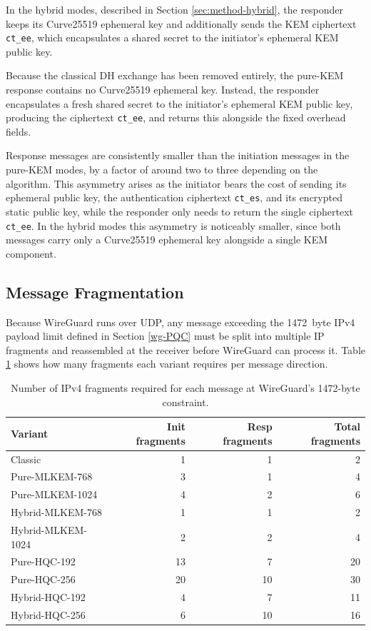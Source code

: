 In the hybrid modes, described in Section \ref{sec:method-hybrid}, the responder keeps its Curve25519 ephemeral key and additionally sends the KEM ciphertext \texttt{ct\_ee}, which encapsulates a shared secret to the initiator's ephemeral KEM public key.  

Because the classical DH exchange has been removed entirely, the pure-KEM response contains no Curve25519 ephemeral key. Instead, the responder encapsulates a fresh shared secret to the initiator's ephemeral KEM public key, producing the ciphertext \texttt{ct\_ee}, and returns this alongside the fixed overhead fields.

Response messages are consistently smaller than the initiation messages in the pure-KEM modes, by a factor of around two to three depending on the algorithm. This asymmetry arises as the initiator bears the cost of sending its ephemeral public key, the authentication ciphertext \texttt{ct\_es}, and its encrypted static public key, while the responder only needs to return the single ciphertext \texttt{ct\_ee}. In the hybrid modes this asymmetry is noticeably smaller, since both messages carry only a Curve25519 ephemeral key alongside a single KEM component.

\subsection{Message Fragmentation}\label{sec:results-fragmentation}

Because WireGuard runs over UDP, any message exceeding the \qty{1472}{byte} IPv4 payload limit defined in Section \ref{wg-PQC} must be split into multiple IP fragments and reassembled at the receiver before WireGuard can process it. Table \ref{tab:Fragments} shows how many fragments each variant requires per message direction.

\begin{table}[H]
\centering
\begin{tabular}{|l|rr|r|}
\hline
\textbf{Variant} & Init fragments & Resp fragments & Total fragments \\
\hline
Classic           & 1  & 1  & 2  \\
Pure-MLKEM-768    & 3  & 1  & 4  \\
Pure-MLKEM-1024   & 4  & 2  & 6  \\
Hybrid-MLKEM-768  & 1  & 1  & 2  \\
Hybrid-MLKEM-1024 & 2  & 2  & 4  \\
Pure-HQC-192      & 13 & 7  & 20 \\
Pure-HQC-256      & 20 & 10 & 30 \\
Hybrid-HQC-192    & 4  & 7  & 11 \\
Hybrid-HQC-256    & 6  & 10 & 16 \\
\hline
\end{tabular}
\caption{Number of IPv4 fragments required for each message at WireGuard's 1472-byte constraint.}
\label{tab:Fragments}
\end{table}


